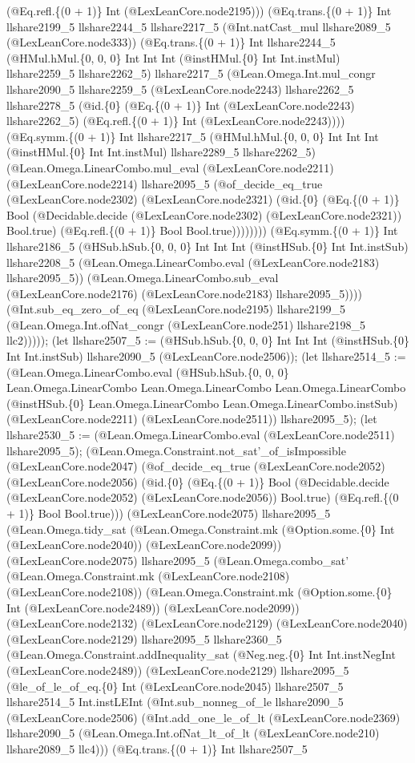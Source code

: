 \documentclass[11pt]{article}
\begin{document}
(@Eq.refl.\{(0 + 1)\} Int (@LexLeanCore.node2195))) (@Eq.trans.\{(0 + 1)\} Int llshare2199\_5 llshare2244\_5 llshare2217\_5 (@Int.natCast\_mul llshare2089\_5 (@LexLeanCore.node333)) (@Eq.trans.\{(0 + 1)\} Int llshare2244\_5 (@HMul.hMul.\{0, 0, 0\} Int Int Int (@instHMul.\{0\} Int Int.instMul) llshare2259\_5 llshare2262\_5) llshare2217\_5 (@Lean.Omega.Int.mul\_congr llshare2090\_5 llshare2259\_5 (@LexLeanCore.node2243) llshare2262\_5 llshare2278\_5 (@id.\{0\} (@Eq.\{(0 + 1)\} Int (@LexLeanCore.node2243) llshare2262\_5) (@Eq.refl.\{(0 + 1)\} Int (@LexLeanCore.node2243)))) (@Eq.symm.\{(0 + 1)\} Int llshare2217\_5 (@HMul.hMul.\{0, 0, 0\} Int Int Int (@instHMul.\{0\} Int Int.instMul) llshare2289\_5 llshare2262\_5) (@Lean.Omega.LinearCombo.mul\_eval (@LexLeanCore.node2211) (@LexLeanCore.node2214) llshare2095\_5 (@of\_decide\_eq\_true (@LexLeanCore.node2302) (@LexLeanCore.node2321) (@id.\{0\} (@Eq.\{(0 + 1)\} Bool (@Decidable.decide (@LexLeanCore.node2302) (@LexLeanCore.node2321)) Bool.true) (@Eq.refl.\{(0 + 1)\} Bool Bool.true)))))))) (@Eq.symm.\{(0 + 1)\} Int llshare2186\_5 (@HSub.hSub.\{0, 0, 0\} Int Int Int (@instHSub.\{0\} Int Int.instSub) llshare2208\_5 (@Lean.Omega.LinearCombo.eval (@LexLeanCore.node2183) llshare2095\_5)) (@Lean.Omega.LinearCombo.sub\_eval (@LexLeanCore.node2176) (@LexLeanCore.node2183) llshare2095\_5)))) (@Int.sub\_eq\_zero\_of\_eq (@LexLeanCore.node2195) llshare2199\_5 (@Lean.Omega.Int.ofNat\_congr (@LexLeanCore.node251) llshare2198\_5 llc2))))); (let llshare2507\_5 := (@HSub.hSub.\{0, 0, 0\} Int Int Int (@instHSub.\{0\} Int Int.instSub) llshare2090\_5 (@LexLeanCore.node2506)); (let llshare2514\_5 := (@Lean.Omega.LinearCombo.eval (@HSub.hSub.\{0, 0, 0\} Lean.Omega.LinearCombo Lean.Omega.LinearCombo Lean.Omega.LinearCombo (@instHSub.\{0\} Lean.Omega.LinearCombo Lean.Omega.LinearCombo.instSub) (@LexLeanCore.node2211) (@LexLeanCore.node2511)) llshare2095\_5); (let llshare2530\_5 := (@Lean.Omega.LinearCombo.eval (@LexLeanCore.node2511) llshare2095\_5); (@Lean.Omega.Constraint.not\_sat'\_of\_isImpossible (@LexLeanCore.node2047) (@of\_decide\_eq\_true (@LexLeanCore.node2052) (@LexLeanCore.node2056) (@id.\{0\} (@Eq.\{(0 + 1)\} Bool (@Decidable.decide (@LexLeanCore.node2052) (@LexLeanCore.node2056)) Bool.true) (@Eq.refl.\{(0 + 1)\} Bool Bool.true))) (@LexLeanCore.node2075) llshare2095\_5 (@Lean.Omega.tidy\_sat (@Lean.Omega.Constraint.mk (@Option.some.\{0\} Int (@LexLeanCore.node2040)) (@LexLeanCore.node2099)) (@LexLeanCore.node2075) llshare2095\_5 (@Lean.Omega.combo\_sat' (@Lean.Omega.Constraint.mk (@LexLeanCore.node2108) (@LexLeanCore.node2108)) (@Lean.Omega.Constraint.mk (@Option.some.\{0\} Int (@LexLeanCore.node2489)) (@LexLeanCore.node2099)) (@LexLeanCore.node2132) (@LexLeanCore.node2129) (@LexLeanCore.node2040) (@LexLeanCore.node2129) llshare2095\_5 llshare2360\_5 (@Lean.Omega.Constraint.addInequality\_sat (@Neg.neg.\{0\} Int Int.instNegInt (@LexLeanCore.node2489)) (@LexLeanCore.node2129) llshare2095\_5 (@le\_of\_le\_of\_eq.\{0\} Int (@LexLeanCore.node2045) llshare2507\_5 llshare2514\_5 Int.instLEInt (@Int.sub\_nonneg\_of\_le llshare2090\_5 (@LexLeanCore.node2506) (@Int.add\_one\_le\_of\_lt (@LexLeanCore.node2369) llshare2090\_5 (@Lean.Omega.Int.ofNat\_lt\_of\_lt (@LexLeanCore.node210) llshare2089\_5 llc4))) (@Eq.trans.\{(0 + 1)\} Int llshare2507\_5 
\end{document}
